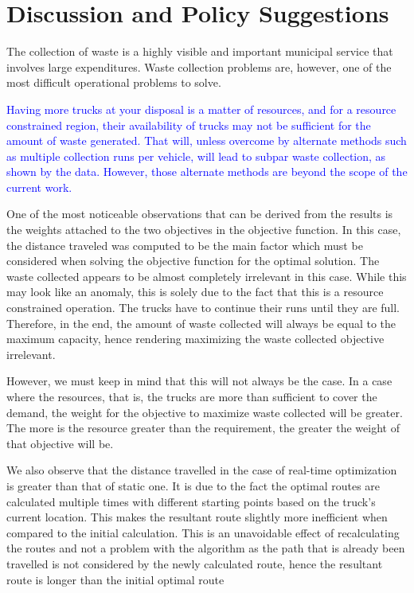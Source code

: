 \documentclass[12pt]{article}
\begin{document}
\section{Discussion and Policy Suggestions}

The collection of waste is a highly visible and important municipal service that involves large expenditures. Waste collection problems are, however, one of the most difficult operational problems to solve.

\textcolor{blue}{Having more trucks at your disposal is a matter of resources, and for a resource constrained region, their availability of trucks may not be sufficient for the amount of waste generated. That will, unless overcome by alternate methods such as multiple collection runs per vehicle, will lead to subpar waste collection, as shown by the data. However, those alternate methods are beyond the scope of the current work.}

One of the most noticeable observations that can be derived from the results is the weights attached to the two objectives in the objective function. In this case, the distance traveled was computed to be the main factor which must be considered when solving the objective function for the optimal solution. The waste collected appears to be almost completely irrelevant in this case. While this may look like an anomaly, this is solely due to the fact that this is a resource constrained operation. The trucks  have to continue their runs until they are full. Therefore, in the end, the amount of waste collected will always be equal to the maximum capacity, hence rendering maximizing the waste collected objective irrelevant.

However, we must keep in mind that this will not always be the case. In a case where the resources, that is, the trucks are more than sufficient to cover the demand, the weight for the objective to maximize waste collected will be greater. The more is the resource greater than the requirement, the greater the weight of that objective will be.

We also observe that the distance travelled in the case of real-time optimization is greater than that of static one. It is due to the fact the optimal routes are calculated multiple times with different starting points based on the truck's current location. This makes the resultant route slightly more inefficient when compared to the initial calculation. This is an unavoidable effect of recalculating the routes and not a problem with the algorithm as the path that is already been travelled is not considered by the newly calculated route, hence the resultant route is longer than the initial optimal route
\end{document}
